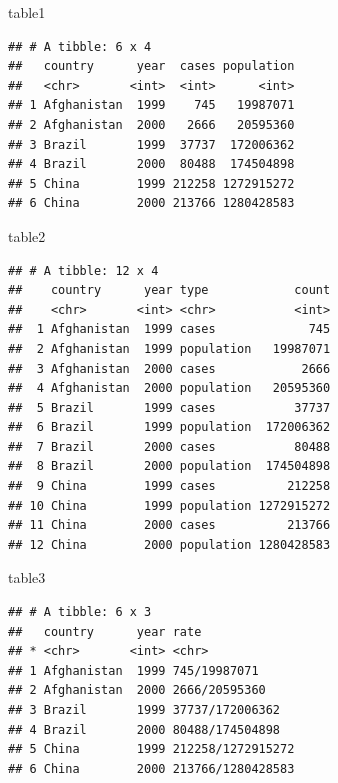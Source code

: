 \documentclass[]{book}
\newenvironment{Shaded}{\begin{snugshade}}{\end{snugshade}}
\newcommand{\NormalTok}[1]{#1}
\begin{document}
\begin{Shaded}
\begin{Highlighting}[]
\NormalTok{table1                  }
\end{Highlighting}
\end{Shaded}

\begin{verbatim}
## # A tibble: 6 x 4
##   country      year  cases population
##   <chr>       <int>  <int>      <int>
## 1 Afghanistan  1999    745   19987071
## 2 Afghanistan  2000   2666   20595360
## 3 Brazil       1999  37737  172006362
## 4 Brazil       2000  80488  174504898
## 5 China        1999 212258 1272915272
## 6 China        2000 213766 1280428583
\end{verbatim}

\begin{Shaded}
\begin{Highlighting}[]
\NormalTok{table2                  }
\end{Highlighting}
\end{Shaded}

\begin{verbatim}
## # A tibble: 12 x 4
##    country      year type            count
##    <chr>       <int> <chr>           <int>
##  1 Afghanistan  1999 cases             745
##  2 Afghanistan  1999 population   19987071
##  3 Afghanistan  2000 cases            2666
##  4 Afghanistan  2000 population   20595360
##  5 Brazil       1999 cases           37737
##  6 Brazil       1999 population  172006362
##  7 Brazil       2000 cases           80488
##  8 Brazil       2000 population  174504898
##  9 China        1999 cases          212258
## 10 China        1999 population 1272915272
## 11 China        2000 cases          213766
## 12 China        2000 population 1280428583
\end{verbatim}

\begin{Shaded}
\begin{Highlighting}[]
\NormalTok{table3                  }
\end{Highlighting}
\end{Shaded}

\begin{verbatim}
## # A tibble: 6 x 3
##   country      year rate             
## * <chr>       <int> <chr>            
## 1 Afghanistan  1999 745/19987071     
## 2 Afghanistan  2000 2666/20595360    
## 3 Brazil       1999 37737/172006362  
## 4 Brazil       2000 80488/174504898  
## 5 China        1999 212258/1272915272
## 6 China        2000 213766/1280428583
\end{verbatim}
\end{document}
